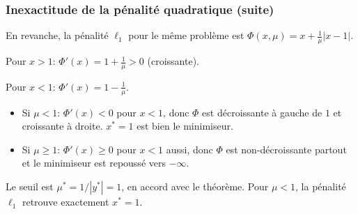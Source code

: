 \documentclass[t,usepdftitle=false,aspectratio=169]{beamer}
\begin{document}
\begin{frame}
\frametitle{Inexactitude de la pénalité quadratique (suite)}

En revanche, la pénalité $\ell_1$ pour le même problème est $\Phi(x,\mu) = x + \frac{1}{\mu}|x-1|$.

\mbox{}

Pour $x > 1$: $\Phi'(x) = 1 + \frac{1}{\mu} > 0$ (croissante).

Pour $x < 1$: $\Phi'(x) = 1 - \frac{1}{\mu}$.
\begin{itemize}
\item Si $\mu < 1$: $\Phi'(x) < 0$ pour $x < 1$, donc $\Phi$ est décroissante à gauche de $1$ et croissante à droite. $x^* = 1$ est bien le minimiseur.
\item Si $\mu \geq 1$: $\Phi'(x) \geq 0$ pour $x < 1$ aussi, donc $\Phi$ est non-décroissante partout et le minimiseur est repoussé vers $-\infty$.
\end{itemize}

\mbox{}

Le seuil est $\mu^* = 1/|y^*| = 1$, en accord avec le théorème. Pour $\mu < 1$, la pénalité $\ell_1$ retrouve exactement $x^* = 1$.

\end{frame}
\end{document}
